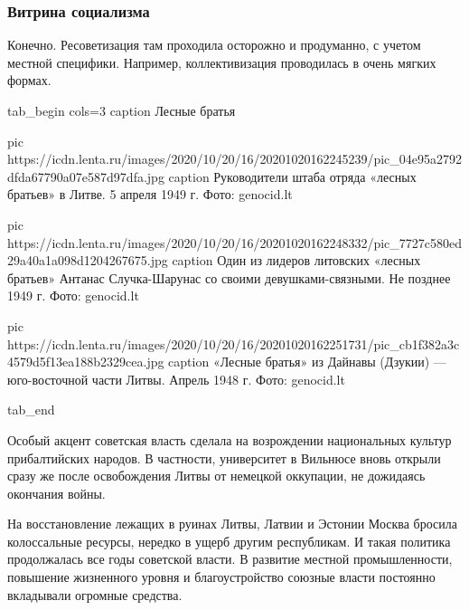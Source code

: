  
 
 
 
 
\subsubsection{Витрина социализма}


Конечно. Ресоветизация там проходила осторожно и продуманно, с учетом местной
специфики. Например, коллективизация проводилась в очень мягких формах.

\ifcmt
tab_begin cols=3
	caption Лесные братья

	pic https://icdn.lenta.ru/images/2020/10/20/16/20201020162245239/pic_04e95a2792dfda67790a07e587d97dfa.jpg
	caption Руководители штаба отряда «лесных братьев» в Литве. 5 апреля 1949 г.  Фото: genocid.lt

	pic https://icdn.lenta.ru/images/2020/10/20/16/20201020162248332/pic_7727c580ed29a40a1a098d1204267675.jpg
	caption Один из лидеров литовских «лесных братьев» Антанас Случка-Шарунас со своими девушками-связными. Не позднее 1949 г. Фото: genocid.lt

	pic https://icdn.lenta.ru/images/2020/10/20/16/20201020162251731/pic_cb1f382a3c4579d5f13ea188b2329cea.jpg
	caption «Лесные братья» из Дайнавы (Дзукии) — юго-восточной части Литвы. Апрель 1948 г.  Фото: genocid.lt

tab_end
\fi

Особый акцент советская власть сделала на возрождении национальных культур
прибалтийских народов. В частности, университет в Вильнюсе вновь открыли сразу
же после освобождения Литвы от немецкой оккупации, не дожидаясь окончания
войны.

На восстановление лежащих в руинах Литвы, Латвии и Эстонии Москва бросила
колоссальные ресурсы, нередко в ущерб другим республикам. И такая политика
продолжалась все годы советской власти. В развитие местной промышленности,
повышение жизненного уровня и благоустройство союзные власти постоянно
вкладывали огромные средства.

